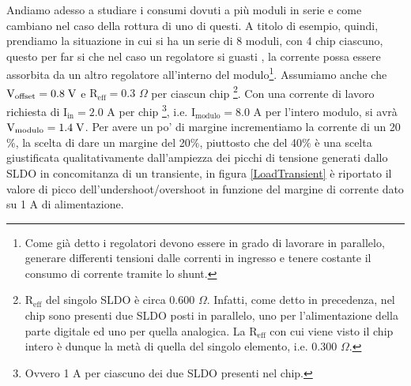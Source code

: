 Andiamo adesso a studiare i consumi dovuti a più moduli in serie e come cambiano nel caso della rottura di uno di questi.
A titolo di esempio, quindi, prendiamo la situazione in cui si ha un serie di 8 moduli, con 4 chip ciascuno, questo per far si che nel caso un regolatore si guasti , la corrente possa essere assorbita da un altro regolatore all'interno del modulo\footnote{Come già detto i regolatori devono essere in grado di lavorare in parallelo, generare differenti tensioni dalle correnti in ingresso e tenere costante il consumo di corrente tramite lo shunt.}. 
Assumiamo anche che $\mathrm{V_{offset}=0.8} \rm \; V$ e $\mathrm{R_{eff}=0.3}$ $\Omega$ per ciascun chip
\footnote{
  $\mathrm{R_{eff}}$ del singolo SLDO è circa 0.600 $\Omega$.
  Infatti, come detto in precedenza, nel chip sono presenti due SLDO posti in parallelo, uno per l'alimentazione della parte digitale ed uno per quella analogica.
  La $\mathrm{R_{eff}}$ con cui viene visto il chip intero è dunque la metà di quella del singolo elemento, i.e. 0.300 $\Omega$.
}.
Con una corrente di lavoro richiesta di $\mathrm{I_{in}=2.0}$ A per chip
\footnote{
  Ovvero 1 A per ciascuno dei due SLDO presenti nel chip.
},
i.e. $\mathrm{I_{modulo}=8.0}$ A per l'intero modulo, si avrà $\mathrm{V_{modulo}=1.4} \rm \; V$.
Per avere un po' di margine incrementiamo la corrente di un 20$\%$, la scelta di dare un margine del 20$\%$, piuttosto che del 40$\%$ è una scelta giustificata qualitativamente dall'ampiezza dei picchi di tensione generati dallo SLDO in concomitanza di un transiente, in figura \ref{LoadTransient} è riportato il valore di picco dell'undershoot/overshoot in funzione del margine di corrente dato su 1 A di alimentazione.
